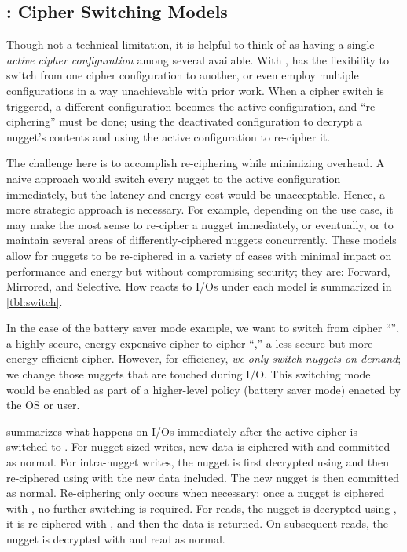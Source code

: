 \subsection{\sysA: Cipher Switching Models}\label{subsec:des-switch}

Though not a technical limitation, it is helpful to think of \sys as having a
single {\em active cipher configuration} among several available. With \sysA,
\sys has the flexibility to switch from one cipher configuration to another, or
even employ multiple configurations in a way unachievable with prior work. When
a cipher switch is triggered, a different configuration becomes the active
configuration, and ``re-ciphering'' must be done; \ie using the deactivated
configuration to decrypt a nugget's contents and using the active configuration
to re-cipher it.

The challenge here is to accomplish re-ciphering while minimizing overhead. A
naive approach would switch every nugget to the active configuration
immediately, but the latency and energy cost would be unacceptable. Hence, a
more strategic approach is necessary. For example, depending on the use case, it
may make the most sense to re-cipher a nugget immediately, or eventually, or to
maintain several areas of differently-ciphered nuggets concurrently. These
models allow for nuggets to be re-ciphered in a variety of cases with minimal
impact on performance and energy but without compromising security; they are:
Forward, Mirrored, and Selective. How \sys reacts to I/Os under each model is
summarized in \cref{tbl:switch}.




 In the case of the battery saver mode example, we
want to switch from cipher ``\cone'', a highly-secure, energy-expensive cipher
to cipher ``\ctwo,'' a less-secure but more energy-efficient cipher. However,
for efficiency, {\em we only switch nuggets on demand}; \ie we change those
nuggets that are touched during I/O. This switching model would be enabled as
part of a higher-level policy (\ie battery saver mode) enacted by the OS or
user.

 summarizes what happens on I/Os immediately after the active
cipher is switched to \ctwo. For nugget-sized writes, new data is ciphered with
\ctwo and committed as normal. For intra-nugget writes, the nugget is first
decrypted using \cone and then re-ciphered using \ctwo with the new data
included. The new nugget is then committed as normal. Re-ciphering only occurs
when necessary; once a nugget is ciphered with \ctwo, no further switching is
required. For reads, the nugget is decrypted using \cone, it is re-ciphered with
\ctwo, and then the data is returned. On subsequent reads, the nugget is
decrypted with \ctwo and read as normal.

